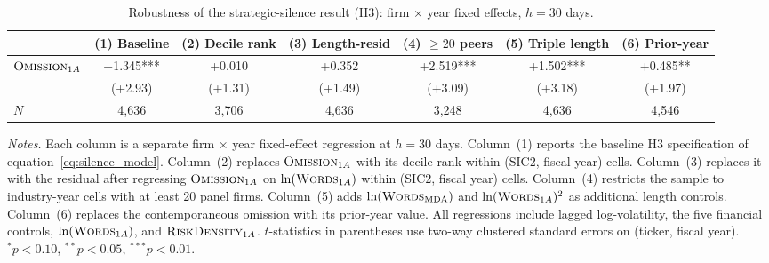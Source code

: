 \begin{table}[htbp]
\centering
\caption{Robustness of the strategic-silence result (H3): firm $\times$ year fixed effects, $h = 30$ days.}
\label{tab:silence_robust}
\footnotesize
\setlength{\tabcolsep}{3pt}
\begin{tabular*}{\textwidth}{@{\extracolsep{\fill}}lcccccc@{}}
\toprule
& (1) Baseline & (2) Decile rank & (3) Length-resid & (4) $\geq 20$ peers & (5) Triple length & (6) Prior-year \\
\midrule
$\textsc{Omission}_{1A}$ & +1.345*** & +0.010 & +0.352 & +2.519*** & +1.502*** & +0.485** \\
& (+2.93) & (+1.31) & (+1.49) & (+3.09) & (+3.18) & (+1.97) \\
$N$ & 4,636 & 3,706 & 4,636 & 3,248 & 4,636 & 4,546 \\
\bottomrule
\end{tabular*}
\par\smallskip
\begin{flushleft}\footnotesize
\textit{Notes.} Each column is a separate firm $\times$ year fixed-effect regression at $h = 30$ days. Column~(1) reports the baseline H3 specification of equation~\ref{eq:silence_model}. Column~(2) replaces $\textsc{Omission}_{1A}$ with its decile rank within (SIC2, fiscal year) cells. Column~(3) replaces it with the residual after regressing $\textsc{Omission}_{1A}$ on $\ln(\textsc{Words}_{1A})$ within (SIC2, fiscal year) cells. Column~(4) restricts the sample to industry-year cells with at least 20 panel firms. Column~(5) adds $\ln(\textsc{Words}_{\mathrm{MDA}})$ and $\ln(\textsc{Words}_{1A})^2$ as additional length controls. Column~(6) replaces the contemporaneous omission with its prior-year value. All regressions include lagged log-volatility, the five financial controls, $\ln(\textsc{Words}_{1A})$, and $\textsc{RiskDensity}_{1A}$. $t$-statistics in parentheses use two-way clustered standard errors on (ticker, fiscal year). $^{*}p<0.10$, $^{**}p<0.05$, $^{***}p<0.01$.
\end{flushleft}
\end{table}
